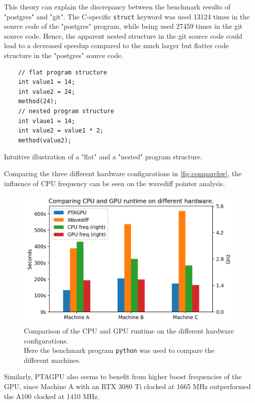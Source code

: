 This theory can explain the discrepancy between the benchmark results of "postgres" and "git". The C-specific \texttt{struct} keyword was used 13124 times in the source code of the "postgres" program, while being used 27459 times in the git source code. Hence, the apparent nested structure in the git source code could lead to a decreased speedup compared to the much larger but flatter code structure in the "postgres" source code.

\begin{listing}
    \begin{verbatim}
    // flat program structure
    int value1 = 14;
    int value2 = 24;
    method(24);
    // nested program structure
    int vlaue1 = 14;
    int value2 = value1 * 2;
    method(value2);
    \end{verbatim}
    \caption{Intuitive illustration of a "flat" and a "nested" program structure.}
    \label{lst:flatprogram}
\end{listing}

Comparing the three different hardware configurations in \autoref{fig:comparehw}, the influence of CPU frequency can be seen on the wavediff pointer analysis.
\begin{figure}
    \centering
    \includegraphics[width=.9\textwidth]{img/comparehw.png}
    \caption[Comparison of the different hardware configurations.]{Comparison of the CPU and GPU runtime on the different hardware configurations.\\Here the benchmark program \texttt{python} was used to compare the different machines.}
    \label{fig:comparehw}
\end{figure}
Similarly, PTAGPU also seems to benefit from higher boost frequencies of the GPU, since Machine A with an RTX 3080 Ti clocked at 1665 MHz outperformed the A100 clocked at 1410 MHz.

